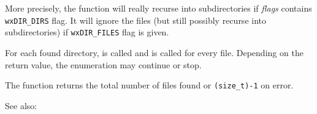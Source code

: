 More precisely, the function will really recurse into subdirectories if 
{\it flags} contains {\tt wxDIR\_DIRS} flag. It will ignore the files (but
still possibly recurse into subdirectories) if {\tt wxDIR\_FILES} flag is
given.

For each found directory,  is called
and  is called for every file.
Depending on the return value, the enumeration may continue or stop.

The function returns the total number of files found or {\tt (size\_t)-1} on
error.

See also: 

